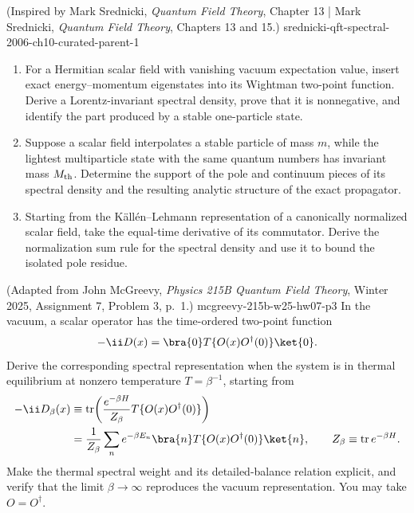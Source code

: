 
\begin{enumerate}
  {(Inspired by Mark Srednicki, \emph{Quantum Field Theory}, Chapter 13 | Mark Srednicki, \emph{Quantum Field Theory}, Chapters 13 and 15.)}
  {srednicki-qft-spectral-2006-ch10-curated-parent-1}
\begin{enumerate}
\item
For a Hermitian scalar field with vanishing vacuum expectation value,
insert exact energy--momentum eigenstates into its Wightman two-point
function.  Derive a Lorentz-invariant spectral density, prove that it is
nonnegative, and identify the part produced by a stable one-particle state.
\item
Suppose a scalar field interpolates a stable particle of mass \(m\), while
the lightest multiparticle state with the same quantum numbers has invariant
mass \(M_{\rm th}\).  Determine the support of the pole and continuum pieces
of its spectral density and the resulting analytic structure of the exact
propagator.
\item
Starting from the K\"all\'en--Lehmann representation of a canonically
normalized scalar field, take the equal-time derivative of its commutator.
Derive the normalization sum rule for the spectral density and use it to
bound the isolated pole residue.
\end{enumerate}

  {(Adapted from John McGreevy, \emph{Physics 215B Quantum Field Theory}, Winter 2025, Assignment 7, Problem 3, p.~1.)}
  {mcgreevy-215b-w25-hw07-p3}
In the vacuum, a scalar operator has the time-ordered two-point function
\[
 -\ii D(x)=\bra{0}T\{O(x)O^\dagger(0)\}\ket{0}.
\]
Derive the corresponding spectral representation when the system is in
thermal equilibrium at nonzero temperature \(T=\beta^{-1}\), starting from
\[
 \begin{split}
 -\ii D_\beta(x)
 &\equiv \operatorname{tr}\!\left(
       \frac{e^{-\beta H}}{Z_\beta}
       T\{O(x)O^\dagger(0)\}\right)\\
 &=\frac{1}{Z_\beta}\sum_n e^{-\beta E_n}
   \bra{n}T\{O(x)O^\dagger(0)\}\ket{n},
 \qquad Z_\beta\equiv\operatorname{tr}e^{-\beta H}.
 \end{split}
\]
Make the thermal spectral weight and its detailed-balance relation explicit,
and verify that the limit \(\beta\to\infty\) reproduces the vacuum
representation.  You may take \(O=O^\dagger\).


\end{enumerate}

